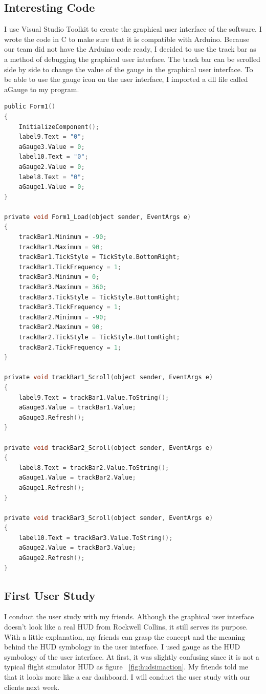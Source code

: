 \subsection{Interesting Code}
I use Visual Studio Toolkit to create the graphical user interface of the software. I wrote the code in C to make sure that it is compatible with Arduino. Because our team did not have the Arduino code ready, I decided to use the track bar as a method of debugging the graphical user interface. The track bar can be scrolled side by side to change the value of the gauge in the graphical user interface. To be able to use the gauge icon on the user interface, I imported a dll file called aGauge to my program. 

\begin{lstlisting}[language=c]
public Form1()
{
    InitializeComponent();
    label9.Text = "0";
    aGauge3.Value = 0;
    label10.Text = "0";
    aGauge2.Value = 0;
    label8.Text = "0";
    aGauge1.Value = 0;
}

private void Form1_Load(object sender, EventArgs e)
{
    trackBar1.Minimum = -90;
    trackBar1.Maximum = 90;
    trackBar1.TickStyle = TickStyle.BottomRight;
    trackBar1.TickFrequency = 1;
    trackBar3.Minimum = 0;
    trackBar3.Maximum = 360;
    trackBar3.TickStyle = TickStyle.BottomRight;
    trackBar3.TickFrequency = 1;
    trackBar2.Minimum = -90;
    trackBar2.Maximum = 90;
    trackBar2.TickStyle = TickStyle.BottomRight;
    trackBar2.TickFrequency = 1;
}

private void trackBar1_Scroll(object sender, EventArgs e)
{
    label9.Text = trackBar1.Value.ToString();
    aGauge3.Value = trackBar1.Value;
    aGauge3.Refresh();
}

private void trackBar2_Scroll(object sender, EventArgs e)
{
    label8.Text = trackBar2.Value.ToString();
    aGauge1.Value = trackBar2.Value;
    aGauge1.Refresh();
}

private void trackBar3_Scroll(object sender, EventArgs e)
{
    label10.Text = trackBar3.Value.ToString();
    aGauge2.Value = trackBar3.Value;
    aGauge2.Refresh();
}
\end{lstlisting}

\subsection{First User Study}
I conduct the user study with my friends. Although the graphical user interface doesn’t look like a real HUD from Rockwell Collins, it still serves its purpose. With a little explanation, my friends can grasp the concept and the meaning behind the HUD symbology in the user interface. I used gauge as the HUD symbology of the user interface. At first, it was slightly confusing since it is not a typical flight simulator HUD as figure ~\ref{fig:hudsimaction}. My friends told me that it looks more like a car dashboard. I will conduct the user study with our clients next week.  

